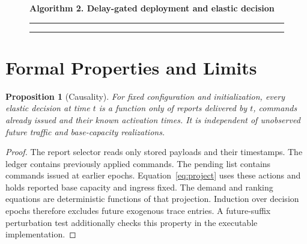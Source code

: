 \documentclass[10pt,a4paper]{article}
\newtheorem{proposition}{Proposition}
\newcommand{\algline}[3]{\node[anchor=west,font=\small] at (#2,-.48*#1) {#3};\node[anchor=east,font=\scriptsize,text=gray] at (-.15,-.48*#1) {#1}}
\begin{document}
\begin{figure}[htbp]\centering
\begin{minipage}{.96\linewidth}
\textbf{Algorithm 2. Delay-gated deployment and elastic decision}\par\smallskip\hrule\smallskip
{}\hrule
\end{minipage}
\end{figure}

\section{Formal Properties and Limits}
\begin{proposition}[Causality]
For fixed configuration and initialization, every elastic decision at time $t$
is a function only of reports delivered by $t$, commands already issued and
their known activation times. It is independent of unobserved future traffic
and base-capacity realizations.
\end{proposition}
\begin{proof}
The report selector reads only stored payloads and their timestamps. The ledger
contains previously applied commands. The pending list contains commands issued
at earlier epochs. Equation~\eqref{eq:project} uses these actions and holds
reported base capacity and ingress fixed. The demand and ranking equations are
deterministic functions of that projection. Induction over decision epochs
therefore excludes future exogenous trace entries. A future-suffix perturbation
test additionally checks this property in the executable implementation.
\end{proof}
\end{document}
